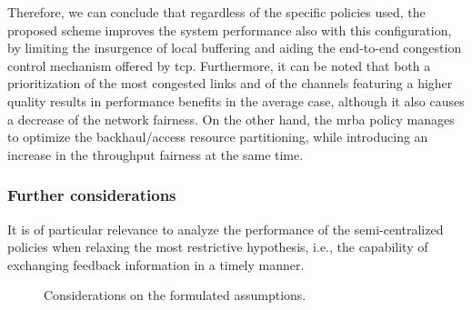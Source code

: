 Therefore, we can conclude that regardless of the specific policies used, the proposed scheme improves the system performance also with this configuration, by limiting the insurgence of local buffering and aiding the end-to-end congestion control mechanism offered by \gls{tcp}. Furthermore, it can be noted that both a prioritization of the most congested links and of the channels featuring a higher quality results in performance benefits in the average case, although it also causes a decrease of the network fairness. On the other hand, the \gls{mrba} policy manages to optimize the backhaul/access resource partitioning, while introducing an increase in the throughput fairness at the same time.

%    

\vspace{-.3cm}
\subsubsection{Further considerations}

It is of particular relevance to analyze the performance of the semi-centralized policies when relaxing the most restrictive hypothesis, i.e., the capability of exchanging feedback information in a timely manner.
\begin{figure}[t!]
  \centering
  \hfill
   \caption{Considerations on the formulated assumptions.}
  \label{Fig:Assump}
      \vspace{-.6cm} 
\end{figure}

